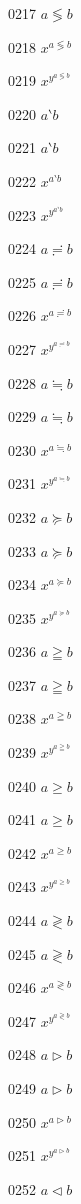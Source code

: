 \documentclass{article}
\begin{document}
0217 $\displaystyle a\lessgtr b$\par
0218 $x^{a\lessgtr b}$\par
0219 $x^{y^{a\lessgtr b}}$\par
0220 $a\backprime b$\par
0221 $\displaystyle a\backprime b$\par
0222 $x^{a\backprime b}$\par
0223 $x^{y^{a\backprime b}}$\par
0224 $a\risingdotseq b$\par
0225 $\displaystyle a\risingdotseq b$\par
0226 $x^{a\risingdotseq b}$\par
0227 $x^{y^{a\risingdotseq b}}$\par
0228 $a\fallingdotseq b$\par
0229 $\displaystyle a\fallingdotseq b$\par
0230 $x^{a\fallingdotseq b}$\par
0231 $x^{y^{a\fallingdotseq b}}$\par
0232 $a\succcurlyeq b$\par
0233 $\displaystyle a\succcurlyeq b$\par
0234 $x^{a\succcurlyeq b}$\par
0235 $x^{y^{a\succcurlyeq b}}$\par
0236 $a\geqq b$\par
0237 $\displaystyle a\geqq b$\par
0238 $x^{a\geqq b}$\par
0239 $x^{y^{a\geqq b}}$\par
0240 $a\geqslant b$\par
0241 $\displaystyle a\geqslant b$\par
0242 $x^{a\geqslant b}$\par
0243 $x^{y^{a\geqslant b}}$\par
0244 $a\gtrless b$\par
0245 $\displaystyle a\gtrless b$\par
0246 $x^{a\gtrless b}$\par
0247 $x^{y^{a\gtrless b}}$\par
0248 $a\vartriangleright b$\par
0249 $\displaystyle a\vartriangleright b$\par
0250 $x^{a\vartriangleright b}$\par
0251 $x^{y^{a\vartriangleright b}}$\par
0252 $a\vartriangleleft b$\par
\end{document}
